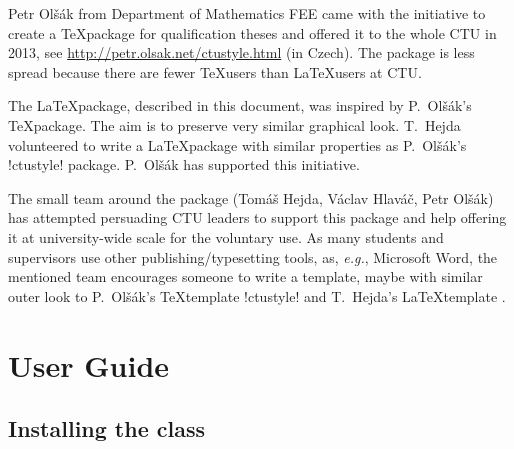\documentclass[twoside]{ctuthesis}
\theoremstyle{plain}
\theoremstyle{definition}
\theoremstyle{note}
\begin{document}
Petr Olšák from Department of Mathematics FEE came with the initiative to create a \TeX\@ package for qualification theses and offered it to the whole CTU in 2013, see \url{http://petr.olsak.net/ctustyle.html} (in Czech). The package is less spread because there are fewer \TeX\@ users than \LaTeX\@ users at CTU.

The \ctuclsname\@ \LaTeX\@ package, described in this document, was inspired by P.~Olšák's \TeX\@ package. The aim is to preserve very similar graphical look. T.~Hejda volunteered to write a \LaTeX\@ package with similar properties as P.~Olšák's \ctulst!ctustyle! package. P.~Olšák has supported this initiative.

The small team around the \ctuclsname\@ package (Tomáš Hejda, Václav Hlaváč, Petr Olšák) has attempted persuading CTU leaders to support this package and help offering it at university-wide scale for the voluntary use. As many students and supervisors use other publishing/typesetting tools, as, \emph{e.g.}, Microsoft Word, the mentioned team encourages someone to write a template, maybe with similar outer look to P.~Olšák's \TeX\@ template \ctulst!ctustyle! and T.~Hejda's \LaTeX\@ template \ctuclsname. 






\chapter{User Guide}
\label{chap:ug}





\section{Installing the class}
\end{document}
